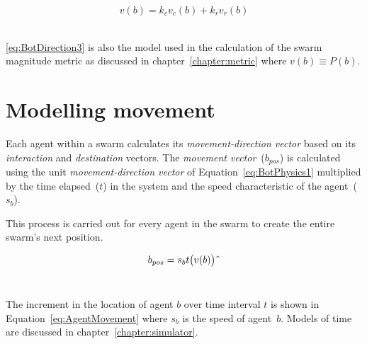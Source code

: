 \begin{center}
\begin{equation}
\label{eq:BotDirection3}
v(b) =‎ k_cv_c(b) + k_rv_r(b)
\end{equation}‎
\end{center}

\autoref{eq:BotDirection3} is also the model used in the calculation of the swarm magnitude metric as discussed in chapter~\ref{chapter:metric} where $v(b) \equiv P(b)$.

\section{Modelling movement}\label{sec:Direction1}
Each agent within a swarm calculates its \textit{movement-direction vector} based on its \textit{interaction} and \textit{destination} vectors. The \textit{movement vector}~($b_{pos}$) is calculated using the unit \textit{movement-direction vector} of Equation~\ref{eq:BotPhysics1} multiplied by the time elapsed~($t$) in the system and the speed characteristic of the agent~($s_b$).

This process is carried out for every agent in the swarm to create the entire swarm's next position.

\begin{center}
\begin{equation}
\label{eq:AgentMovement}
b_{pos}=s_{b}t\big(v(b)\big)\string^ 
\end{equation}‎
\end{center}

The increment in the location of agent $b$ over time interval $t$ is shown in Equation~\ref{eq:AgentMovement} where $s_b$ is the speed of agent~$b$. Models of time are discussed in chapter~\ref{chapter:simulator}. 




